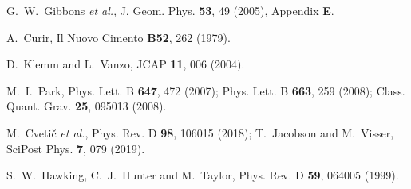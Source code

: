 \documentclass[preprint,aps,tightenlines,showkeys,nofootinbib,superscriptaddress]{revtex4}
\begin{document}
\begin{thebibliography}{999}
G.~W.~Gibbons \textit{et al.},
J. Geom. Phys. \textbf{53}, 49
(2005), Appendix {\bf E}.

A.~Curir,
Il Nuovo Cimento {\bf B52}, 262
(1979).

D.~Klemm and L.~Vanzo,
JCAP \textbf{11}, 006 (2004).

M.~I.~Park,
Phys. Lett. B \textbf{647}, 472
(2007);
Phys. Lett. B \textbf{663}, 259
(2008);
Class. Quant. Grav. \textbf{25}, 095013 (2008).

M.~Cveti\v{c} \textit{et al.},
Phys. Rev. D \textbf{98},
106015 (2018);
T.~Jacobson and M.~Visser,
SciPost Phys. \textbf{7},
079 (2019).

S.~W.~Hawking, C.~J.~Hunter and M.~Taylor,
Phys. Rev. D \textbf{59}, 064005 (1999).


\end{thebibliography}
\end{document}
